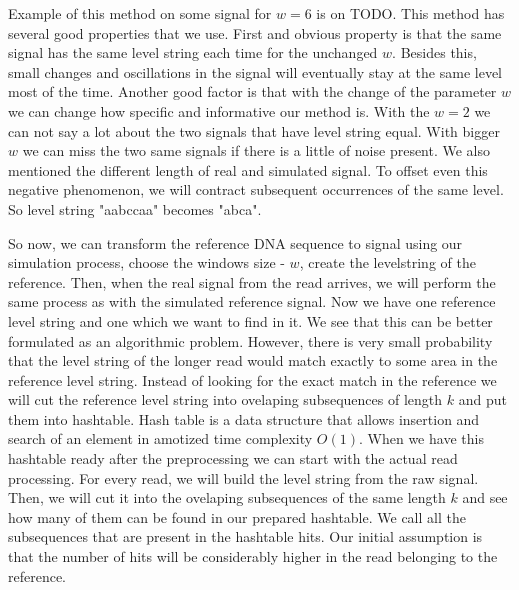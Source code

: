 
Example of this method on some signal for $w=6$ is on TODO. This method has several good
properties that we use. First and obvious property is that the same signal has the
same level string each time for the unchanged $w$. Besides this, small changes and
oscillations in the signal will eventually stay at the same level most of the time.
Another good factor is that with the change of the parameter $w$ we can change how specific
and informative our method is. With the $w=2$ we can not say a lot about the two signals
that have level string equal. With bigger $w$ we can miss the two same signals
if there is a little of noise present. We also mentioned the different length of
real and simulated signal. To offset even this negative phenomenon, we will contract
subsequent occurrences of the same level. So level string "aabccaa" becomes "abca".

So now, we can transform the reference DNA sequence to signal using our simulation
process, choose the windows size - $w$, create the levelstring of the reference.
Then, when the real signal from the read arrives, we will perform the same process
as with the simulated reference signal. Now we have one reference level string and
one which we want to find in it. We see that this can be better formulated as an
algorithmic problem. However, there is very small probability that the level string
of the longer read would match exactly to some area in the reference level string.
Instead of looking for the exact match in the reference we will cut the reference
level string into ovelaping subsequences of length $k$ and put them into hashtable.
Hash table is a data structure that allows insertion and search of an element in
amotized time complexity $O(1)$. When we have this hashtable ready after the
preprocessing we can start with the actual read processing. For every read, we will
build the level string from the raw signal. Then, we will cut it into the ovelaping
subsequences of the same length $k$ and see how many of them can be found in our
prepared hashtable. We call all the subsequences that are present in the hashtable
hits. Our initial assumption is that the number of hits will be considerably higher
in the read belonging to the reference. 

